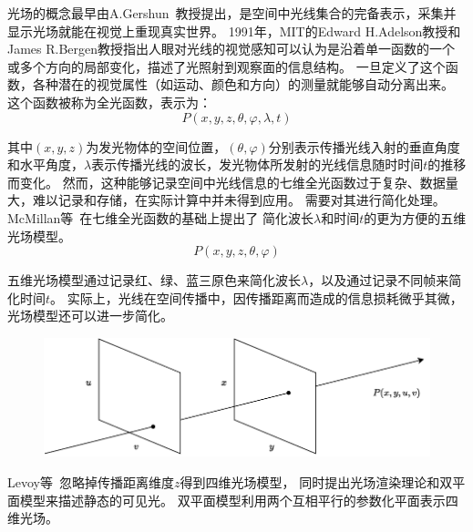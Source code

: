 
\label{chap:part2}


光场的概念最早由A.Gershun~\cite{gershun1939light}教授提出，是空间中光线集合的完备表示，采集并显示光场就能在视觉上重现真实世界。
1991年，MIT的Edward H.Adelson教授和James R.Bergen\cite{adelson1991plenoptic}教授指出人眼对光线的视觉感知可以认为是沿着单一函数的一个或多个方向的局部变化，描述了光照射到观察面的信息结构。
一旦定义了这个函数，各种潜在的视觉属性（如运动、颜色和方向）的测量就能够自动分离出来。
这个函数被称为全光函数，表示为：
\begin{equation}
	P(x,y,z,\theta,\varphi,\lambda,t)
\end{equation}\par
其中$(x,y,z)$为发光物体的空间位置，$(\theta,\varphi)$分别表示传播光线入射的垂直角度和水平角度，$\lambda$表示传播光线的波长，发光物体所发射的光线信息随时时间$t$的推移而变化。
然而，这种能够记录空间中光线信息的七维全光函数过于复杂、数据量大，难以记录和存储，在实际计算中并未得到应用。
需要对其进行简化处理。
McMillan等~\cite{mcmillan2023plenoptic}在七维全光函数的基础上提出了
简化波长$\lambda$和时间$t$的更为方便的五维光场模型。
\begin{equation}
	P(x,y,z,\theta,\varphi)
\end{equation}\par
五维光场模型通过记录红、绿、蓝三原色来简化波长$\lambda$，以及通过记录不同帧来简化时间$t$。
实际上，光线在空间传播中，因传播距离而造成的信息损耗微乎其微，光场模型还可以进一步简化。
\begin{figure}[!ht]
	\centering
	\includegraphics[width=0.95\linewidth]{figures/chapter2/double_plane_model.drawio}
	\label{chapter2_fig1:double_plane}
\end{figure}
Levoy等~\cite{levoy2023light}忽略掉传播距离维度$z$得到四维光场模型，
同时提出光场渲染理论和双平面模型来描述静态的可见光。
双平面模型利用两个互相平行的参数化平面表示四维光场。
